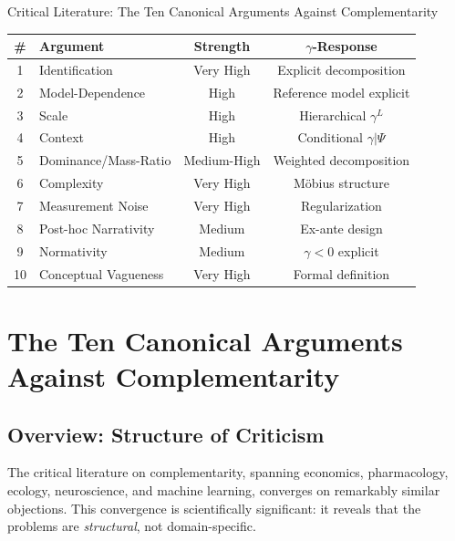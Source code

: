\begin{chapter}{Critical Literature: The Ten Canonical Arguments Against Complementarity}
\begin{tcolorbox}[colback=yellow!5!white,colframe=yellow!75!black,title=\textbf{Quick Reference: The Ten Canonical Arguments}]
\small
\renewcommand{\arraystretch}{1.2}
\begin{tabular}{@{}clcc@{}}
\toprule
\textbf{\#} & \textbf{Argument} & \textbf{Strength} & \textbf{$\gamma$-Response} \\
\midrule
1 & Identification & Very High & Explicit decomposition \\
2 & Model-Dependence & High & Reference model explicit \\
3 & Scale & High & Hierarchical $\gamma^L$ \\
4 & Context & High & Conditional $\gamma|\Psi$ \\
5 & Dominance/Mass-Ratio & Medium-High & Weighted decomposition \\
6 & Complexity & Very High & Möbius structure \\
7 & Measurement Noise & Very High & Regularization \\
8 & Post-hoc Narrativity & Medium & Ex-ante design \\
9 & Normativity & Medium & $\gamma < 0$ explicit \\
10 & Conceptual Vagueness & Very High & Formal definition \\
\bottomrule
\end{tabular}
\end{tcolorbox}

\section{The Ten Canonical Arguments Against Complementarity}
\label{sec:ten-arguments}

\subsection{Overview: Structure of Criticism}

The critical literature on complementarity, spanning economics, pharmacology, ecology, neuroscience, and machine learning, converges on remarkably similar objections. This convergence is scientifically significant: it reveals that the problems are \textit{structural}, not domain-specific.


\end{chapter}
